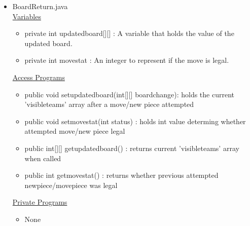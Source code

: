 \documentclass[12pt]{article}
\begin{document}
\begin{itemize}
\item BoardReturn.java \\
\underline{Variables}
\begin{itemize}
	\item private int updatedboard[][] : A variable that holds the value of the updated board.
	\item private int movestat : An integer to represent if the move is legal.
	
\end{itemize}
\underline{Access Programs}
\begin{itemize}
	\item public void setupdatedboard(int[][] boardchange): holds the current 'visibleteams' array after a move/new piece attempted 
	\item public void setmovestat(int status) : holds int value determing whether attempted move/new piece legal
	\item public int[][] getupdatedboard() : returns current 'visibleteams' array when called
	\item public int getmovestat() : returns whether previous attempted newpiece/movepiece was legal
\end{itemize}
\underline{Private Programs}
\begin{itemize}
	\item None
\end{itemize}
	

\end{itemize}
\end{document}
